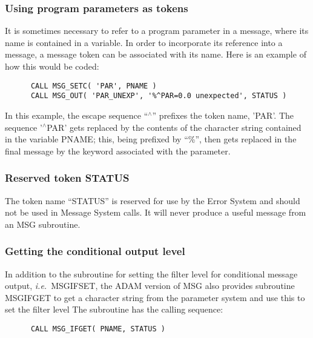 \documentclass[twoside,11pt]{article}
\newcommand{\xlabel}[1]{}
\renewcommand{\_}{\texttt{\symbol{95}}}
\begin{document}
\subsubsection{\xlabel{using_program_parameters_as_tokens}Using program parameters as tokens}

It is sometimes necessary to refer to a program parameter in a message, where
its name is contained in a variable.
In order to incorporate its reference into a message, a message token can be
associated with its name.
Here is an example of how this would be coded:

\begin {small}
\begin{verbatim}
      CALL MSG_SETC( 'PAR', PNAME )
      CALL MSG_OUT( 'PAR_UNEXP', '%^PAR=0.0 unexpected', STATUS )
\end{verbatim}
\end {small}

In this example, the escape sequence ``$^\wedge$'' prefixes the token name,
'PAR'.
The sequence '$^\wedge$PAR' gets replaced by the contents of the character
string contained in the variable PNAME; this, being prefixed by ``\%'', then
gets replaced in the final message by the keyword associated with the
parameter.


\subsubsection{\xlabel{reserved_token_status}Reserved token STATUS}

The token name ``STATUS'' is reserved for use by the Error System and should
not be used in Message System calls. It will never produce a useful message
from an MSG subroutine.


\subsubsection{\xlabel{getting_the_conditional_output_level}Getting the conditional output level}

In addition to the subroutine for setting the filter level for conditional
message output, \textit{i.e.}\ MSG\_IFSET, the ADAM version of MSG also provides
subroutine MSG\_IFGET to get a character string from the parameter system and
use this to set the filter level
The subroutine has the calling sequence:

\begin {small}
\begin{verbatim}
      CALL MSG_IFGET( PNAME, STATUS )
\end{verbatim}
\end {small}
\end{document}
